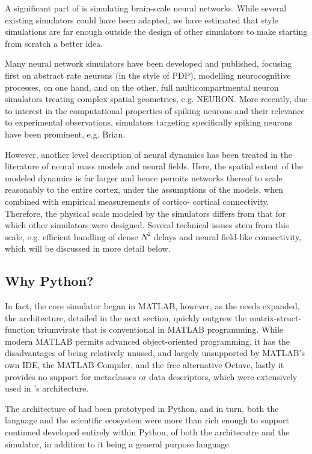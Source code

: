 A significant part of \TVB is simulating brain-scale neural networks. While
several existing simulators could have been adapted, we have estimated that
\TVB style simulations are far enough outside the design of other simulators to
make starting from scratch a better idea.

Many neural network simulators have been developed and published, focusing
first on abstract rate neurons (in the style of PDP), modelling neurocognitive
processes, on one hand, and on the other, full multicompartmental neuron
simulators treating complex spatial geometries, e.g. NEURON.  More recently,
due to interest in the computational properties of spiking neurons and their
relevance to experimental observations, simulators targeting specifically
spiking neurons have been prominent, e.g. Brian.

However, another level description of neural dynamics has been treated
in the literature of neural mass models and neural fields. Here, the spatial
extent of the modeled dynamics is far larger and hence permits networks 
thereof to scale reasonably to the entire cortex, under the assumptions 
of the models, when combined with empirical measurements of cortico-
cortical connectivity. Therefore, the physical scale modeled by the \TVB
simulators differs from that for which other simulators were designed.
Several technical issues stem from this scale, e.g. efficient handling
of dense $N^2$ delays and neural field-like connectivity, which will be
discussed in more detail below. 

\subsection{Why Python?}

In fact, the core simulator began in MATLAB, however, as the needs 
expanded, the architecture, detailed in the next section, quickly 
outgrew the matrix-struct-function triumvirate that is conventional
in MATLAB programming. While modern MATLAB permits advanced object-oriented
programming, it has the disadvantages of being relatively unused, and
largely unsupported by MATLAB's own IDE, the MATLAB Compiler, and the free
alternative Octave, lastly it provides no support for metaclasses or data
descriptors, which were extensively used in \TVB's architecture.

The architecture of \TVB had been prototyped in Python, and in turn, both the
language and the scientific ecosystem were more than rich enough to support
continued developed entirely within Python, of both the architecutre and the
simulator, in addition to it being a general purpose language. 

